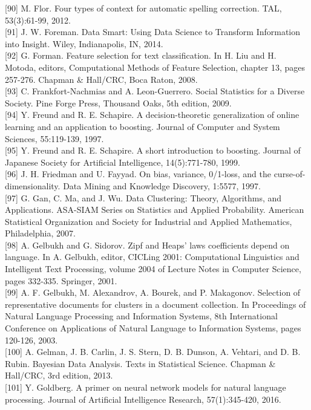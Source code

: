 \documentclass[10pt]{book}
\begin{document}
[90] M. Flor. Four types of context for automatic spelling correction. TAL, 53(3):61-99, 2012.\\[0pt]
[91] J. W. Foreman. Data Smart: Using Data Science to Transform Information into Insight. Wiley, Indianapolis, IN, 2014.\\[0pt]
[92] G. Forman. Feature selection for text classification. In H. Liu and H. Motoda, editors, Computational Methods of Feature Selection, chapter 13, pages 257-276. Chapman \& Hall/CRC, Boca Raton, 2008.\\[0pt]
[93] C. Frankfort-Nachmias and A. Leon-Guerrero. Social Statistics for a Diverse Society. Pine Forge Press, Thousand Oaks, 5th edition, 2009.\\[0pt]
[94] Y. Freund and R. E. Schapire. A decision-theoretic generalization of online learning and an application to boosting. Journal of Computer and System Sciences, 55:119-139, 1997.\\[0pt]
[95] Y. Freund and R. E. Schapire. A short introduction to boosting. Journal of Japanese Society for Artificial Intelligence, 14(5):771-780, 1999.\\[0pt]
[96] J. H. Friedman and U. Fayyad. On bias, variance, 0/1-loss, and the curse-of-dimensionality. Data Mining and Knowledge Discovery, 1:5577, 1997.\\[0pt]
[97] G. Gan, C. Ma, and J. Wu. Data Clustering: Theory, Algorithms, and Applications. ASA-SIAM Series on Statistics and Applied Probability. American Statistical Organization and Society for Industrial and Applied Mathematics, Philadelphia, 2007.\\[0pt]
[98] A. Gelbukh and G. Sidorov. Zipf and Heaps' laws coefficients depend on language. In A. Gelbukh, editor, CICLing 2001: Computational Linguistics and Intelligent Text Processing, volume 2004 of Lecture Notes in Computer Science, pages 332-335. Springer, 2001.\\[0pt]
[99] A. F. Gelbukh, M. Alexandrov, A. Bourek, and P. Makagonov. Selection of representative documents for clusters in a document collection. In Proceedings of Natural Language Processing and Information Systems, 8th International Conference on Applications of Natural Language to Information Systems, pages 120-126, 2003.\\[0pt]
[100] A. Gelman, J. B. Carlin, J. S. Stern, D. B. Dunson, A. Vehtari, and D. B. Rubin. Bayesian Data Analysis. Texts in Statistical Science. Chapman \& Hall/CRC, 3rd edition, 2013.\\[0pt]
[101] Y. Goldberg. A primer on neural network models for natural language processing. Journal of Artificial Intelligence Research, 57(1):345-420, 2016.\\[0pt]
\end{document}
